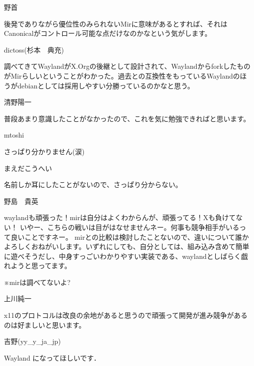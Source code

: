 %

\begin{prework}{ 野首 }

後発でありながら優位性のみられないMirに意味があるとすれば、それはCanonicalがコントロール可能な点だけなのかなという気がします。

\end{prework}

\begin{prework}{ dictoss(杉本　典充) }

調べてきてWaylandがX.Orgの後継として設計されて、WaylandからforkしたものがMirらしいということがわかった。過去との互換性をもっているWaylandのほうがdebianとしては採用しやすい分勝っているのかなと思う。

\end{prework}

\begin{prework}{  清野陽一 }

普段あまり意識したことがなかったので、これを気に勉強できればと思います。
\end{prework}

\begin{prework}{ mtoshi }

さっぱり分かりません(涙)
\end{prework}

\begin{prework}{ まえだこうへい }

名前しか耳にしたことがないので、さっぱり分からない。
\end{prework}

\begin{prework}{ 野島　貴英 }

waylandも頑張った！mirは自分はよくわからんが、頑張ってる！Xも負けてない！
いやー、こちらの戦いは目がはなせませんネー。何事も競争相手がいるって良いことですネー。
mirとの比較は検討したことないので、違いについて誰かよろしくおねがいします。いずれにしても、自分としては、組み込み含めて簡単に遊べそうだし、中身すっごいわかりやすい実装である、waylandとしばらく戯れようと思ってます。

※mirは調べてないよ?

\end{prework}

\begin{prework}{ 上川純一 }

x11のプロトコルは改良の余地があると思うので頑張って開発が進み競争があるのは好ましいと思います。
\end{prework}

\begin{prework}{ 吉野(yy\_{}y\_{}ja\_{}jp) }

Wayland になってほしいです．
\end{prework}
